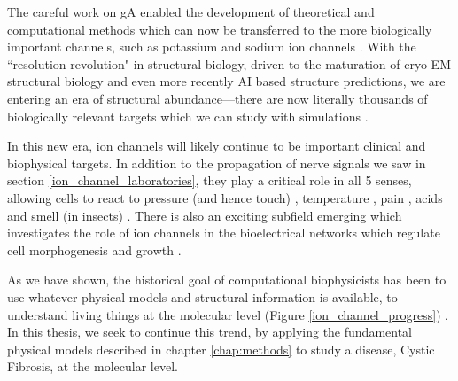 The careful work on gA enabled the development of theoretical and computational methods which can now be transferred to the more biologically important channels, such as potassium and sodium ion channels \cite{rashid2013, li2021, vandenberg2021,flood2019}. With the ``resolution revolution" in structural biology, driven to the maturation of cryo-EM structural biology and even more recently AI based structure predictions, we are entering an era of structural abundance---there are now literally thousands of biologically relevant targets which we can study with simulations \cite{jumper2021, frank2021, cheng2017a}. 


In this new era, ion channels will likely continue to be important clinical and biophysical targets. In addition to the propagation of nerve signals we saw in section \ref{ion_channel_laboratories}, they play a critical role in all 5 senses, allowing cells to react to pressure (and hence touch) \cite{chesler2018}, temperature \cite{castillo2018}, pain \cite{kingwell2019}, acids \cite{kweon2013} and smell (in insects) \cite{sato2008}. There is also an exciting subfield emerging which investigates the role of ion channels in the bioelectrical networks which regulate cell morphogenesis and growth \cite{lang2005, sundelacruz2009, levin2014, levin2014a}.

As we have shown, the historical goal of computational biophysicists has been to use whatever physical models and structural information is available, to understand living things at the molecular level (Figure \ref{ion_channel_progress}) \cite{lev2020, chen2021}. In this thesis, we seek to continue this trend, by applying the fundamental physical models described in chapter \ref{chap:methods} to study a disease, Cystic Fibrosis, at the molecular level.

